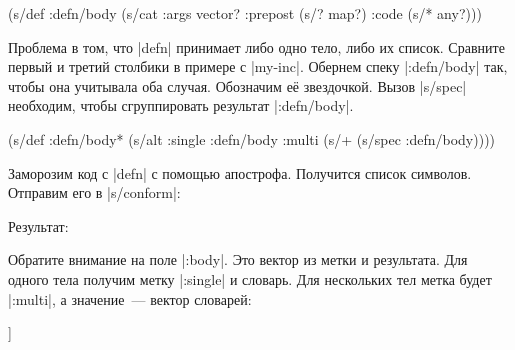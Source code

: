 \begin{english}
  \begin{clojure}
(s/def :defn/body
  (s/cat :args vector?
         :prepost (s/? map?)
         :code (s/* any?)))
  \end{clojure}
\end{english}

Проблема в том, что \spverb|defn| принимает либо одно тело, либо их список.
Сравните первый и третий столбики в примере с \spverb|my-inc|. Обернем спеку
\spverb|:defn/body| так, чтобы она учитывала оба случая. Обозначим е\"{е}
звездочкой. Вызов \spverb|s/spec| необходим, чтобы сгруппировать результат
\spverb|:defn/body|.

\begin{english}
  \begin{clojure}
(s/def :defn/body*
  (s/alt :single :defn/body
         :multi (s/+ (s/spec :defn/body))))
  \end{clojure}
\end{english}


Заморозим код с \spverb|defn| с помощью апострофа. Получится список
символов. Отправим его в \spverb|s/conform|:

\begin{english}
\end{english}

\noindent
Результат:

\begin{english}
\end{english}

Обратите внимание на поле \spverb|:body|. Это вектор из метки и результата. Для
одного тела получим метку \spverb|:single| и словарь. Для нескольких тел метка
будет \spverb|:multi|, а значение~--- вектор словарей:

\begin{english}
  \begin{clojure}
[:multi [{:args [x] :code [(println 1)]}
         {:args [x y] :code [(println 2)]}]]
  \end{clojure}
\end{english}

